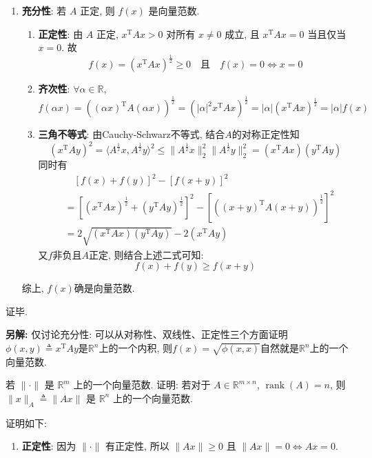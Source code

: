 \documentclass[12pt, answers]{exam}     %
\newcommand{\anothersolution}{\par\noindent\textbf{另解:}}
\newcommand{\R}{\mathbb{R}}
\newcommand{\T}{\mathrm{T}}
\begin{document}
\begin{questions}
\begin{solution}
\begin{enumerate}
    \item \textbf{充分性}: 若 \( A \) 正定, 则 \( f(x) \) 是向量范数.
    \begin{enumerate}
        \item \textbf{正定性}:
        由 \( A \) 正定, \( x^{\T}Ax > 0 \) 对所有 \( x \neq 0 \) 成立, 且 \( x^{\T}Ax = 0 \) 当且仅当 \( x = 0 \). 故
        \[ f(x) = (x^{\T}Ax)^{\frac{1}{2}} \geq 0 \quad \text{且} \quad f(x) = 0 \Leftrightarrow x = 0 \]

        \item \textbf{齐次性}:
        \( \forall \alpha \in \R \),
        \[ f(\alpha x) = ((\alpha x)^{\T}A(\alpha x))^{\frac{1}{2}} = (|\alpha|^2 x^{\T}Ax)^{\frac{1}{2}} = |\alpha| (x^{\T}Ax)^{\frac{1}{2}} = |\alpha| f(x) \]

        \item \textbf{三角不等式}:
        由Cauchy-Schwarz不等式, 结合$A$的对称正定性知
        \[
        \left(x^{\T}Ay \right)^2 = \langle A^{\frac{1}{2}}x, A^{\frac{1}{2}}y \rangle^2 \leq \|A^{\frac{1}{2}}x\|^2_2\|A^{\frac{1}{2}}y\|^2_2 = \left(x^{\T}Ax\right) \left(y^{\T}Ay\right)  
        \]
        同时有\begin{align*}
        &\quad \left[f(x) + f(y)\right]^2 - \left[f(x + y)\right]^2 \\
        &= \left[\left(x^{\T}Ax \right)^{\frac{1}{2}} + \left(y^{\T}Ay \right)^{\frac{1}{2}}\right]^2 - \left[\left((x + y)^{\T}A(x + y)\right)^{\frac{1}{2}}\right]^2  \\
        &= 2\sqrt{\left(x^{\T}Ax\right)\left(y^{\T}Ay\right)} - 2\left(x^{\T}Ay\right)
        \end{align*}
        又\(f\)非负且$A$正定, 则结合上述二式可知: \[ f(x) + f(y) \geq f(x + y) \]
    \end{enumerate}
    综上, $f(x)$确是向量范数.
\end{enumerate}
证毕.
\anothersolution{}
仅讨论充分性: 可以从对称性、双线性、正定性三个方面证明$\phi(x, y) \triangleq x^{\T}Ay$是$\R^n$上的一个内积, 则$f(x) = \sqrt{\phi(x, x)}$自然就是$\R^n$上的一个向量范数.
\end{solution}

\question{}
若 $\|\cdot\|$ 是 $\R^m$ 上的一个向量范数. 证明: 若对于 $A \in \R^{m \times n}$, $\operatorname{rank}(A) = n$, 则
\(
\|x\|_A \triangleq \|A x\|
\)
是 $\R^n$ 上的一个向量范数. 

\begin{solution}
证明如下:
\begin{enumerate}
    \item \textbf{正定性}: 因为 $ \|\cdot\|$ 有正定性, 所以 $\|A x\| \geq 0$ 且 $\|A x\| = 0 \Leftrightarrow A x = 0$.


\end{enumerate}
\end{solution}
\end{questions}
\end{document}

